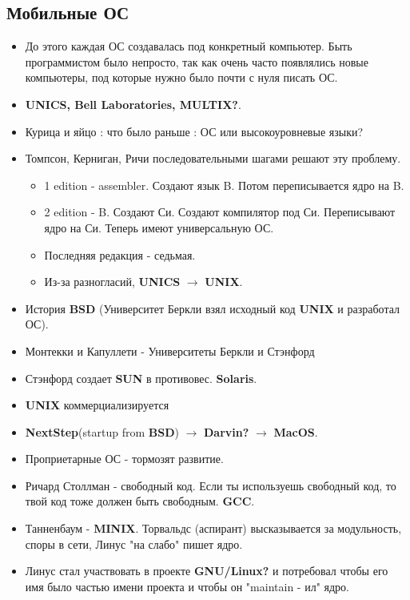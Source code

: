 \documentclass[12pt, a4paper]{report}
\begin{document}
\subsection{Мобильные ОС}
\begin{itemize}
    \item До этого каждая ОС создавалась под конкретный компьютер. Быть программистом было непросто, так как очень часто появлялись новые компьютеры, под которые нужно было почти с нуля писать ОС.

    \item \textbf{UNICS, Bell Laboratories, MULTIX?}.

    \item Курица и яйцо : что было раньше : ОС или высокоуровневые языки?

    \item Томпсон, Керниган, Ричи последовательными шагами решают эту проблему. 
          \begin{itemize}
              \item 1 edition - assembler. Создают язык B. Потом переписывается ядро на B. 
              \item 2 edition - B. Создают Си. Создают компилятор под Си. Переписывают ядро на Си. Теперь имеют универсальную ОС. 
              \item Последняя редакция - седьмая. 
              \item Из-за разногласий, \textbf{UNICS} $\to$ \textbf{UNIX}.
          \end{itemize}
    \item История \textbf{BSD} (Университет Беркли взял исходный код \textbf{UNIX} и разработал ОС).

    \item Монтекки и Капуллети - Университеты Беркли и Стэнфорд

    \item Стэнфорд создает \textbf{SUN} в противовес. \textbf{Solaris}.

    \item \textbf{UNIX} коммерциализируется

    \item \textbf{NextStep}(startup from \textbf{BSD}) $\to$ \textbf{Darvin?} $\to$ \textbf{MacOS}.

    \item Проприетарные ОС - тормозят развитие.

    \item Ричард Столлман - свободный код. Если ты используешь свободный код, то твой код тоже должен быть свободным. \textbf{GCC}.

    \item Танненбаум - \textbf{MINIX}. Торвальдс (аспирант) высказывается за модульность, споры в сети, Линус "на слабо" пишет ядро.

    \item Линус стал участвовать в проекте \textbf{GNU/Linux?} и потребовал чтобы его имя было частью имени проекта и чтобы он "maintain - ил" ядро.
\end{itemize}
\end{document}
